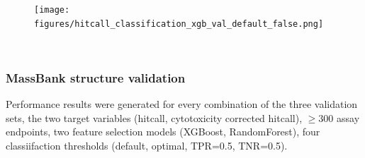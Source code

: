 \begin{figure}[h]
  \centering
  \texttt{[image: figures/hitcall\_classification\_xgb\_val\_default\_false.png]}
  \caption{}
~\label{fig:hitcall_classification_xgb_val_default_false}
\end{figure}

\newpage




\subsubsection{MassBank structure validation}


Performance results were generated for every combination of the three validation sets, the two target variables (hitcall, cytotoxicity corrected hitcall),  $\geq 300$ assay endpoints, two feature selection models (XGBoost, RandomForest), four classiifaction thresholds (default, optimal, TPR=0.5, TNR=0.5). 


